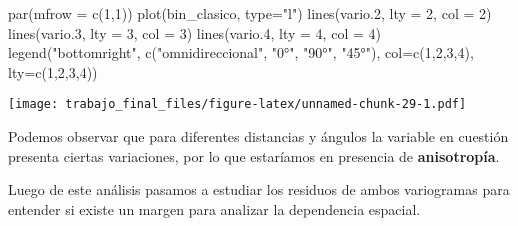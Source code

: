 \documentclass[
  12pt,
]{article}
\newenvironment{Shaded}{\begin{snugshade}}{\end{snugshade}}
\newcommand{\AttributeTok}[1]{\textcolor[rgb]{0.77,0.63,0.00}{#1}}
\newcommand{\DecValTok}[1]{\textcolor[rgb]{0.00,0.00,0.81}{#1}}
\newcommand{\FloatTok}[1]{\textcolor[rgb]{0.00,0.00,0.81}{#1}}
\newcommand{\FunctionTok}[1]{\textcolor[rgb]{0.00,0.00,0.00}{#1}}
\newcommand{\NormalTok}[1]{#1}
\newcommand{\OtherTok}[1]{\textcolor[rgb]{0.56,0.35,0.01}{#1}}
\newcommand{\SpecialCharTok}[1]{\textcolor[rgb]{0.00,0.00,0.00}{#1}}
\newcommand{\StringTok}[1]{\textcolor[rgb]{0.31,0.60,0.02}{#1}}
\begin{document}
\begin{Shaded}
\begin{Highlighting}[]
\FunctionTok{par}\NormalTok{(}\AttributeTok{mfrow =} \FunctionTok{c}\NormalTok{(}\DecValTok{1}\NormalTok{,}\DecValTok{1}\NormalTok{))}
\FunctionTok{plot}\NormalTok{(bin\_clasico, }\AttributeTok{type=}\StringTok{"l"}\NormalTok{)}
\FunctionTok{lines}\NormalTok{(vario}\FloatTok{.2}\NormalTok{, }\AttributeTok{lty =} \DecValTok{2}\NormalTok{, }\AttributeTok{col =} \DecValTok{2}\NormalTok{)}
\FunctionTok{lines}\NormalTok{(vario}\FloatTok{.3}\NormalTok{, }\AttributeTok{lty =} \DecValTok{3}\NormalTok{, }\AttributeTok{col =} \DecValTok{3}\NormalTok{)}
\FunctionTok{lines}\NormalTok{(vario}\FloatTok{.4}\NormalTok{, }\AttributeTok{lty =} \DecValTok{4}\NormalTok{, }\AttributeTok{col =} \DecValTok{4}\NormalTok{)}
\FunctionTok{legend}\NormalTok{(}\StringTok{"bottomright"}\NormalTok{, }\FunctionTok{c}\NormalTok{(}\StringTok{"omnidireccional"}\NormalTok{, }\StringTok{"0°"}\NormalTok{, }\StringTok{"90°"}\NormalTok{, }\StringTok{"45°"}\NormalTok{), }\AttributeTok{col=}\FunctionTok{c}\NormalTok{(}\DecValTok{1}\NormalTok{,}\DecValTok{2}\NormalTok{,}\DecValTok{3}\NormalTok{,}\DecValTok{4}\NormalTok{), }\AttributeTok{lty=}\FunctionTok{c}\NormalTok{(}\DecValTok{1}\NormalTok{,}\DecValTok{2}\NormalTok{,}\DecValTok{3}\NormalTok{,}\DecValTok{4}\NormalTok{))}
\end{Highlighting}
\end{Shaded}

\texttt{[image: trabajo\_final\_files/figure-latex/unnamed-chunk-29-1.pdf]}

Podemos observar que para diferentes distancias y ángulos la variable en
cuestión presenta ciertas variaciones, por lo que estaríamos en
presencia de \textbf{anisotropía}.

Luego de este análisis pasamos a estudiar los residuos de ambos
variogramas para entender si existe un margen para analizar la
dependencia espacial.

\begin{Shaded}
\end{Shaded}
\end{document}
